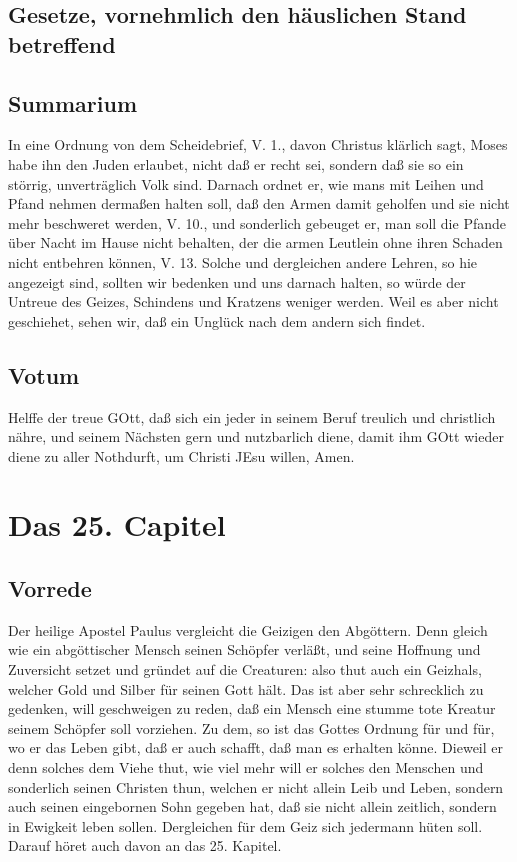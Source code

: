 \section{Gesetze, vornehmlich den häuslichen Stand betreffend}

\section{Summarium}

In eine Ordnung von dem Scheidebrief, V. 1., davon Christus klärlich sagt, Moses habe ihn den Juden erlaubet, nicht daß er recht sei, sondern daß sie so ein störrig, unverträglich Volk sind. Darnach ordnet er, wie mans mit Leihen und Pfand nehmen dermaßen halten soll, daß den Armen damit geholfen und sie nicht mehr beschweret werden, V. 10., und sonderlich gebeuget er, man soll die Pfande über Nacht im Hause nicht behalten, der die armen Leutlein ohne ihren Schaden nicht entbehren können, V. 13. Solche und dergleichen andere Lehren, so hie angezeigt sind, sollten wir bedenken und uns darnach halten, so würde der Untreue des Geizes, Schindens und Kratzens weniger werden. Weil es aber nicht geschiehet, sehen wir, daß ein Unglück nach dem andern sich findet.

\section{Votum}

Helffe der treue GOtt, daß sich ein jeder in seinem Beruf treulich und christlich nähre, und seinem Nächsten gern und nutzbarlich diene, damit ihm GOtt wieder diene zu aller Nothdurft, um Christi JEsu willen, Amen.

\chapter{Das 25. Capitel}

\section{Vorrede}

Der heilige Apostel Paulus vergleicht die Geizigen den Abgöttern. Denn gleich wie ein abgöttischer Mensch seinen Schöpfer verläßt, und seine Hoffnung und Zuversicht setzet und gründet auf die Creaturen: also thut auch ein Geizhals, welcher Gold und Silber für seinen Gott hält. Das ist aber sehr schrecklich zu gedenken, will geschweigen zu reden, daß ein Mensch eine stumme tote Kreatur seinem Schöpfer soll vorziehen. Zu dem, so ist das Gottes Ordnung für und für, wo er das Leben gibt, daß er auch schafft, daß man es erhalten könne. Dieweil er denn solches dem Viehe thut, wie viel mehr will er solches den Menschen und sonderlich seinen Christen thun, welchen er nicht allein Leib und Leben, sondern auch seinen eingebornen Sohn gegeben hat, daß sie nicht allein zeitlich, sondern in Ewigkeit leben sollen. Dergleichen für dem Geiz sich jedermann hüten soll. Darauf höret auch davon an das 25. Kapitel.

